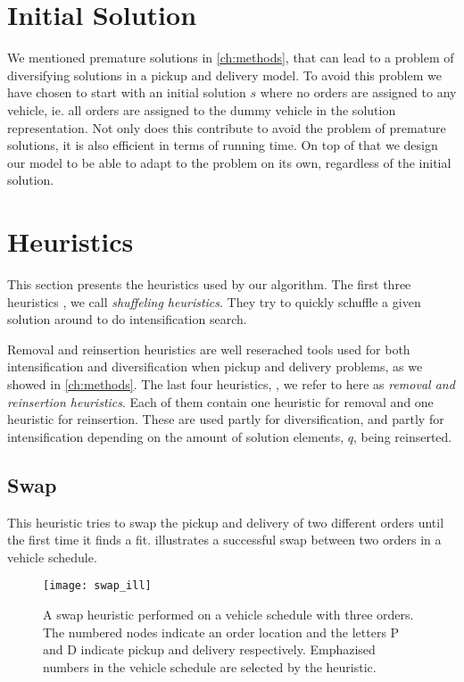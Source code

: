 \documentclass[../main.tex]{subfiles}
\begin{document}
\section{Initial Solution}
\label{sec:init}
We mentioned premature solutions in \cref{ch:methods}, that can lead to a problem of diversifying solutions in a pickup and delivery model. 
To avoid this problem we have chosen to start with an initial solution $s$ where no orders are assigned to any vehicle, ie. all orders are assigned to the dummy vehicle in the solution representation.  
Not only does this contribute to avoid the problem of premature solutions, it is also efficient in terms of running time. On top of that we design our model to be able to adapt to the problem on its own, regardless of the initial solution. 

\section{Heuristics}
\label{sec:heur}
This section presents the heuristics used by our algorithm.
The first three heuristics , we call \textit{shuffeling heuristics}. They try to quickly schuffle a given solution around to do intensification search. \par
Removal and reinsertion heuristics are well reserached tools used for both intensification and diversification when pickup and delivery problems, as we showed in \cref{ch:methods}. 
The last four heuristics, , we refer to here as \textit{removal and reinsertion heuristics}. Each of them contain one heuristic for removal and one heuristic for reinsertion.
These are used partly for diversification, and partly for intensification depending on the amount of solution elements, $q$, being reinserted.  

\subsection{Swap}
\label{sec:swap}
This heuristic tries to swap the pickup and delivery of two different orders until the first time it finds a fit. 
 illustrates a successful swap between two orders in a vehicle schedule. 

\begin{figure}                                                                    
    \centering                                                                                     
    \texttt{[image: swap\_ill]}                                     
    \caption{A swap heuristic performed on a vehicle schedule with three orders. The numbered nodes indicate an order location and the letters P and D indicate pickup and delivery respectively. Emphazised numbers in the vehicle schedule are selected by the heuristic.}
    \label{fig:swap}
\end{figure}
\end{document}
